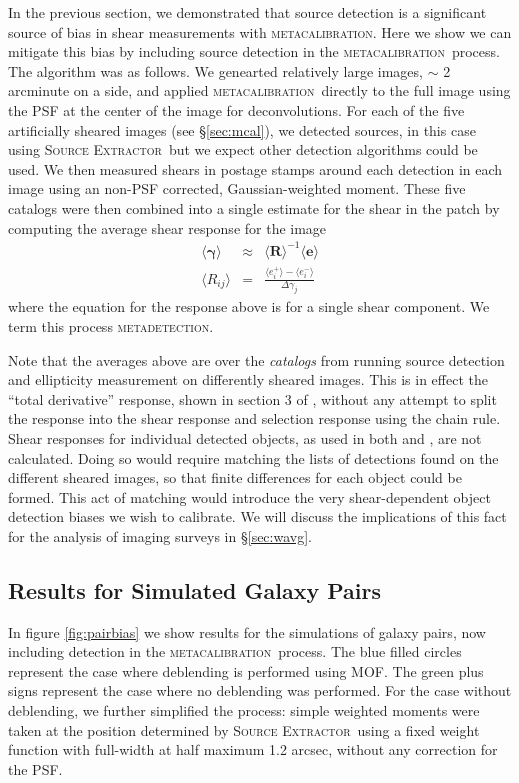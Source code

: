 \documentclass[fleqn,useAMS,usenatbib]{mnras}
\newcommand{\mcal}{\textsc{metacalibration}}
\newcommand{\mdet}{\textsc{metadetection}}
\newcommand{\sx}{\textsc{Source Extractor}}
\begin{document}
In the previous section, we demonstrated that source detection is a significant
source of bias in shear measurements with \mcal. Here we show we can
mitigate this bias by including source detection in the
\mcal\ process. The algorithm was as follows.  We genearted relatively
large images, $\sim$ 2 arcminute on a side, and applied \mcal\ directly
to the full image using the PSF at the center of the image for deconvolutions.
For each of the five artificially sheared images (see \S \ref{sec:mcal}), we
detected sources, in this case using \sx\ but we expect other detection algorithms
could be used. We then measured shears in postage stamps around
each detection in each image using an non-PSF corrected, Gaussian-weighted
moment.  These five catalogs were then combined into a single estimate for the
shear in the patch by computing the average shear response for the image
\begin{eqnarray}
\langle \boldsymbol\gamma \rangle &\approx& \langle \boldsymbol{R}\rangle^{-1}\langle\boldsymbol{e}\rangle\\
\langle R_{ij}\rangle &=& \frac{\langle e_i^{+}\rangle - \langle e_i^{-}\rangle}{\Delta\gamma_j}
\end{eqnarray}
where the equation for the response above is for a single shear component. We term this
process \mdet.

Note that the averages above are over the {\it catalogs} from running source
detection and ellipticity measurement on differently sheared images. This is in
effect the ``total derivative'' response, shown in section 3 of
\cite{SheldonMcal2017}, without any attempt to split the response into the
shear response and selection response using the chain rule.  Shear responses
for individual detected objects, as used in both \cite{SheldonMcal2017} and
\cite{HuffMcal2017}, are not calculated.  Doing so would require matching the
lists of detections found on the different sheared images, so that finite
differences for each object could be formed.  This act of matching would
introduce the very shear-dependent object detection biases we wish to
calibrate.  We will discuss the implications of this fact for the analysis of
imaging surveys in \S \ref{sec:wavg}.

\subsection{Results for Simulated Galaxy Pairs}
\label{sec:mdetpairs}

In figure \ref{fig:pairbias} we show results for the simulations of galaxy
pairs, now including detection in the \mcal\ process. The blue filled circles
represent the case where deblending is performed using MOF. The green plus
signs represent the case where no deblending was performed. For the case
without deblending,  we further simplified the process: simple weighted moments
were taken at the position determined by \sx\ using a fixed weight function
with full-width at half maximum 1.2 arcsec, without any correction for the PSF.
\end{document}
